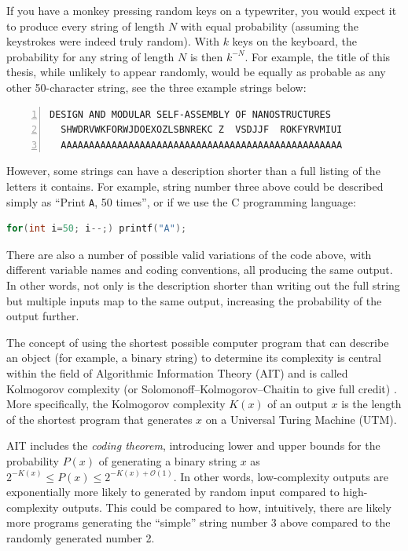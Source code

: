 

If you have a monkey pressing random keys on a typewriter, you would expect it to produce every string of length \(N\) with equal probability (assuming the keystrokes were indeed truly random). With \(k\) keys on the keyboard, the probability for any string of length \(N\) is then \(k^{-N}\). For example, the title of this thesis, while unlikely to appear randomly, would be equally as probable as any other 50-character string, see the three example strings below:
\begin{lstlisting}[numbers=left]
  DESIGN AND MODULAR SELF-ASSEMBLY OF NANOSTRUCTURES
  SHWDRVWKFORWJDOEXOZLSBNREKC Z  VSDJJF  ROKFYRVMIUI
  AAAAAAAAAAAAAAAAAAAAAAAAAAAAAAAAAAAAAAAAAAAAAAAAAA
\end{lstlisting}

However, some strings can have a description shorter than a full listing of the letters it contains. For example, string number three above could be described simply as ``Print \texttt{A}, 50 times'', or if we use the C programming language:

\begin{lstlisting}[language=c]
for(int i=50; i--;) printf("A");
\end{lstlisting}

There are also a number of possible valid variations of the code above, with different variable names and coding conventions, all producing the same output. In other words, not only is the description shorter than writing out the full string but multiple inputs map to the same output, increasing the probability of the output further.

The concept of using the shortest possible computer program that can describe an object (for example, a binary string) to determine its complexity is central within the field of Algorithmic Information Theory (AIT) and is called Kolmogorov complexity (or Solomonoff–Kolmogorov–Chaitin to give full credit) \cite{LiMing2019AitK}. More specifically, the Kolmogorov complexity \(K(x)\) of an output \(x\) is the length of the shortest program that generates \(x\) on a Universal Turing Machine (UTM).

AIT includes the \emph{coding theorem}, introducing lower and upper bounds for the probability \(P(x)\) of generating a binary string \(x\) as \(2^{-K(x)} \le P(x) \le 2^{-K(x) + \mathcal{O} (1)}\). In other words, low-complexity outputs are exponentially more likely to generated by random input compared to high-complexity outputs. This could be compared to how, intuitively, there are likely more programs generating the ``simple'' string number 3 above compared to the randomly generated number 2.

